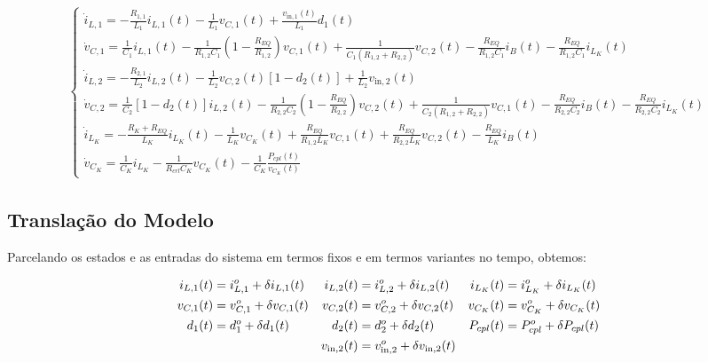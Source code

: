 \begin{gather}
  \begin{cases}
    \dot{i}_{L,1} = - \frac{R_{1,1}}{L_1} i_{L,1}(t) - \frac{1}{L_1} v_{C,1}(t) + \frac{v_{\text{in}, 1}(t)}{L_1} d_1(t)                                                                                                                        \\[12pt]
    \dot{v}_{C,1} = \frac{1}{C_1} i_{L,1}(t) - \frac{1}{R_{1,2}C_1} \left(1  - \frac{R_{EQ}}{R_{1,2}}\right) v_{C,1}(t) +\frac{1}{C_1 (R_{1,2} + R_{2,2})} v_{C,2}(t) - \frac{R_{EQ}}{R_{1,2}C_1} i_B(t) - \frac{R_{EQ}}{R_{1,2}C_1} i_{L_K}(t) \\[12pt]
    \dot{i}_{L,2} = - \frac{R_{2,1}}{L_2} i_{L,2}(t) - \frac{1}{L_2} v_{C,2}(t) \left[1 - d_2(t)\right] + \frac{1}{L_2} v_{\text{in}, 2}(t)                                                                                                     \\[12pt]
    \dot{v}_{C,2} = \frac{1}{C_2} \left[1 - d_2(t)\right] i_{L,2}(t)
    - \frac{1}{R_{2,2} C_2} \left(1 - \frac{R_{EQ}}{R_{2,2}}\right) v_{C,2}(t)
    + \frac{1}{C_2 (R_{1,2} + R_{2,2})} v_{C,1}(t)
    - \frac{R_{EQ}}{R_{2,2}C_2} i_B(t) - \frac{R_{EQ}}{R_{2,2}C_2} i_{L_K}(t)                                                                                                                                                              \\[12pt]
    \dot{i}_{L_K} = - \frac{R_K + R_{EQ}}{L_K} i_{L_K}(t) - \frac{1}{L_K} v_{C_K}(t) + \frac{R_{EQ}}{R_{1,2} L_K} v_{C,1}(t) + \frac{R_{EQ}}{R_{2,2} L_K} v_{C,2}(t) - \frac{R_{EQ}}{L_K} i_B(t)                                                \\[12pt]
    \dot{v}_{C_K} = \frac{1}{C_K} i_{L_K} - \frac{1}{R_{crl} C_K} v_{C_K}(t) - \frac{1}{C_K} \frac{P_{cpl}(t)}{v_{C_K}(t)}
  \end{cases}
\end{gather}


\subsection*{Translação do Modelo}

Parcelando os estados e as entradas do sistema em termos fixos e em termos variantes no tempo, obtemos:

\begin{align}
  i_{L,1}(t) & = i_{L,1}^o + \delta i_{L,1}(t) & i_{L,2}(t) & = i_{L,2}^o + \delta i_{L,2}(t) & i_{L_K}(t) & = i_{L_K}^o + \delta i_{L_K}(t) \nle
  v_{C,1}(t) & = v_{C,1}^o + \delta v_{C,1}(t) & v_{C,2}(t) & = v_{C,2}^o + \delta v_{C,2}(t) & v_{C_K}(t) & = v_{C_K}^o + \delta v_{C_K}(t) \nle
  d_1(t)     & = d_1^o + \delta d_1(t)         & d_2(t)     & = d_2^o + \delta d_2(t)         & P_{cpl}(t) & = P_{cpl}^o + \delta P_{cpl}(t) \nle
             &                                 & v_{\text{in},2}(t)     & = v_{\text{in},2}^o + \delta v_{\text{in},2}(t)         &            &
\end{align}

